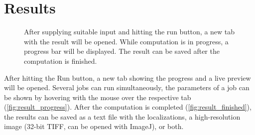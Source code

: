\documentclass[a4paper,12pt,notitlepage]{report}
\begin{document}
\section{Results}
\begin{figure}[ht]
    \hfill
    \caption[]{After supplying suitable input and hitting the run button, a new tab with the result will be opened.  While computation is in progress, a progress bar will be displayed.  The result can be saved after the computation is finished.}
    \label{fig:result}
\end{figure}
After hitting the Run button, a new tab showing the progress and a live preview will be opened. Several jobs can run simultaneously, the parameters of a job can be shown by hovering with the mouse over the respective tab (\autoref{fig:result_progress}). After the computation is completed (\autoref{fig:result_finished}), the results can be saved as a text file with the localizations, a high-resolution image (32-bit TIFF, can be opened with ImageJ), or both.
\end{document}
